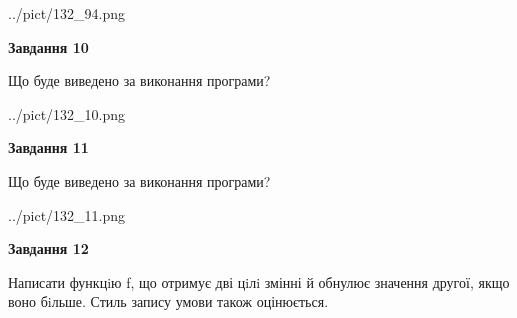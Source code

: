\documentclass[12pt, ukrainian]{article}
\begin{document}
{\begin {large}
\begin{center}
	{../pict/132_94.png}
\end{center}
\newpage

{\begin {center}\textbf{Завдання 10}\end {center}}

Що буде виведено за виконання програми?\par
\begin{center}
	{../pict/132_10.png}
\end{center}
\newpage

{\begin {center}\textbf{Завдання 11}\end {center}}

Що буде виведено за виконання програми?\par
\begin{center}
	{../pict/132_11.png}
\end{center}
\newpage

{\begin {center}\textbf{Завдання 12}\end {center}}


Написати функцiю f, що отримує дві цiлi змінні й обнулює значення другої, якщо воно бiльше. Стиль запису умови також оцінюється.\par
\newpage

\end {large}}
\end{document}
